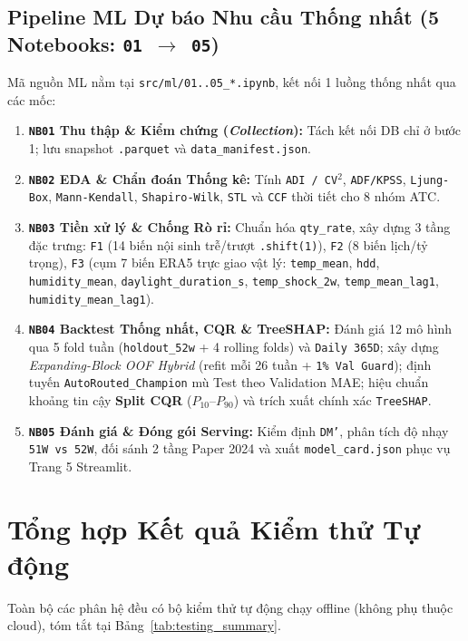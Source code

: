 \subsection{Pipeline ML Dự báo Nhu cầu Thống nhất (5 Notebooks: \texttt{01 $\rightarrow$ 05})}
Mã nguồn ML nằm tại \texttt{src/ml/01..05\_*.ipynb}, kết nối 1 luồng thống nhất qua các mốc:
\begin{enumerate}[leftmargin=1.5em]
  \item \textbf{\texttt{NB01} Thu thập \& Kiểm chứng (\textit{Collection}):} Tách kết nối DB chỉ ở bước 1; lưu snapshot \texttt{.parquet} và \texttt{data\_manifest.json}.
  \item \textbf{\texttt{NB02} EDA \& Chẩn đoán Thống kê:} Tính \texttt{ADI / CV$^2$}, \texttt{ADF/KPSS}, \texttt{Ljung-Box}, \texttt{Mann-Kendall}, \texttt{Shapiro-Wilk}, \texttt{STL} và \texttt{CCF} thời tiết cho 8 nhóm ATC.
  \item \textbf{\texttt{NB03} Tiền xử lý \& Chống Rò rỉ:} Chuẩn hóa \texttt{qty\_rate}, xây dựng 3 tầng đặc trưng: \texttt{F1} (14 biến nội sinh trễ/trượt \texttt{.shift(1)}), \texttt{F2} (8 biến lịch/tỷ trọng), \texttt{F3} (cụm 7 biến ERA5 trực giao vật lý: \texttt{temp\_mean}, \texttt{hdd}, \texttt{humidity\_mean}, \texttt{daylight\_duration\_s}, \texttt{temp\_shock\_2w}, \texttt{temp\_mean\_lag1}, \texttt{humidity\_mean\_lag1}).
  \item \textbf{\texttt{NB04} Backtest Thống nhất, CQR \& TreeSHAP:} Đánh giá 12 mô hình qua 5 fold tuần (\texttt{holdout\_52w} + 4 rolling folds) và \texttt{Daily 365D}; xây dựng \textit{Expanding-Block OOF Hybrid} (refit mỗi 26 tuần + \texttt{1\% Val Guard}); định tuyến \texttt{AutoRouted\_Champion} mù Test theo Validation MAE; hiệu chuẩn khoảng tin cậy \textbf{Split CQR} ($P_{10}$--$P_{90}$) và trích xuất chính xác \texttt{TreeSHAP}.
  \item \textbf{\texttt{NB05} Đánh giá \& Đóng gói Serving:} Kiểm định \texttt{DM'}, phân tích độ nhạy \texttt{51W vs 52W}, đối sánh 2 tầng Paper 2024 và xuất \texttt{model\_card.json} phục vụ Trang 5 Streamlit.
\end{enumerate}

\section{Tổng hợp Kết quả Kiểm thử Tự động}
Toàn bộ các phân hệ đều có bộ kiểm thử tự động chạy offline (không phụ thuộc cloud), tóm tắt tại Bảng~\ref{tab:testing_summary}.

